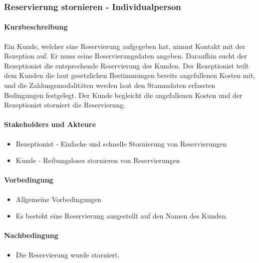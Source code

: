 \subsubsection{Reservierung stornieren - Individualperson}
\label{UseCase_ReservierungStornierenIndividualperson}

\paragraph{Kurzbeschreibung}
Ein \Gls{Kunde}, welcher eine \Gls{Reservierung} aufgegeben hat, nimmt Kontakt mit der \Gls{Rezeption} auf. Er muss seine Reservierungsdaten angeben. Daraufhin sucht der \Gls{Rezeptionist} die entsprechende \Gls{Reservierung} des \Gls{Kunde}n. Der \Gls{Rezeptionist} teilt dem \Gls{Kunde}n die laut gesetzlichen Bestimmungen bereits angefallenen Kosten mit, und die Zahlungsmodalitäten werden laut den \Gls{Stammdaten} erfassten Bedingungen festgelegt. Der \Gls{Kunde} begleicht die angefallenen Kosten und der \Gls{Rezeptionist} storniert die \Gls{Reservierung}.

\paragraph{Stakeholders und Akteure}
\begin{itemize}
\item \Gls{Rezeptionist} - Einfache und schnelle Stornierung von Reservierungen
\item \Gls{Kunde} - Reibungsloses stornieren von Reservierungen
\end{itemize}

\paragraph{Vorbedingung}
\begin{itemize}
\item Allgemeine Vorbedingungen
\item Es besteht eine \Gls{Reservierung} ausgestellt auf den Namen des \Gls{Kunde}n.
\end{itemize}

\paragraph{Nachbedingung}
\begin{itemize}
\item Die \Gls{Reservierung} wurde storniert.
\end{itemize}


